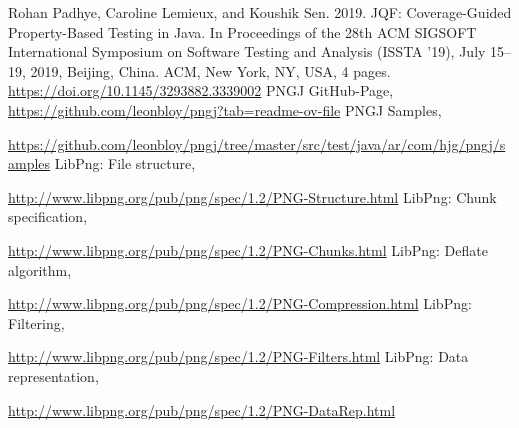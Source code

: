 \documentclass[runningheads]{llncs}
\begin{document}
%
%
%
% 
% 
%
\begin{thebibliography}{8}
Rohan Padhye, Caroline Lemieux, and Koushik Sen. 2019. JQF: Coverage-Guided Property-Based Testing in Java. In Proceedings of the 28th ACM SIGSOFT International Symposium on Software Testing and Analysis (ISSTA ’19), July 15–19, 2019, Beijing, China. ACM, New York, NY, USA, 4 pages. \url{https://doi.org/10.1145/3293882.3339002}
PNGJ GitHub-Page, \url{https://github.com/leonbloy/pngj?tab=readme-ov-file}
PNGJ Samples, 

\url{https://github.com/leonbloy/pngj/tree/master/src/test/java/ar/com/hjg/pngj/samples}
LibPng: File structure,

\url{http://www.libpng.org/pub/png/spec/1.2/PNG-Structure.html}
LibPng: Chunk specification, 

\url{http://www.libpng.org/pub/png/spec/1.2/PNG-Chunks.html}
LibPng: Deflate algorithm,

\url{http://www.libpng.org/pub/png/spec/1.2/PNG-Compression.html}
LibPng: Filtering,

\url{http://www.libpng.org/pub/png/spec/1.2/PNG-Filters.html}
LibPng: Data representation,

\url{http://www.libpng.org/pub/png/spec/1.2/PNG-DataRep.html}
\end{thebibliography}
\end{document}
